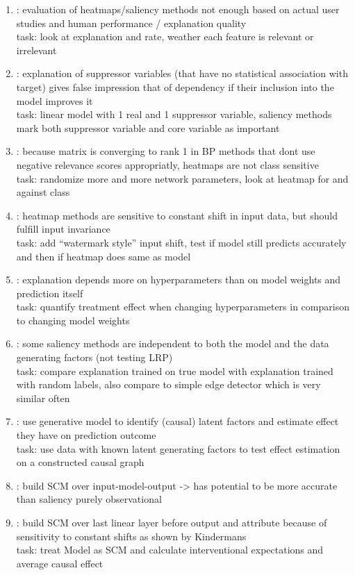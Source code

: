 \begin{enumerate}
      \item \cite{Sixt2022a}: evaluation of heatmaps/saliency methods not enough based on actual user studies and human performance / explanation quality
            \\ task: look at explanation and rate, weather each feature is relevant or irrelevant
      \item \cite{Wilming2023}: explanation of suppressor variables (that have no statistical association with target) gives false impression that of dependency if their inclusion into the model improves it
            \\ task: linear model with 1 real and 1 suppressor variable, saliency methods mark both suppressor variable and core variable as important
      \item \cite{Sixt2020}: because matrix is converging to rank 1 in BP methods that dont use negative relevance scores appropriatly, heatmaps are not class sensitive
            \\ task: randomize more and more network parameters, look at heatmap for and against class
      \item \cite{Kindermans2019}: heatmap methods are sensitive to constant shift in input data, but should fulfill input invariance
            \\ task: add “watermark style” input shift, test if model still predicts accurately and then if heatmap does same as model
      \item \cite{Karimi2023}: explanation depends more on hyperparameters than on model weights and prediction itself
            \\ task: quantify treatment effect when changing hyperparameters in comparison to changing model weights
      \item \cite{Adebayo2018}: some saliency methods are independent to both the model and the data generating factors (not testing LRP)
            \\ task: compare explanation trained on true model with explanation trained with random labels, also compare to simple edge detector which is very similar often
      \item \cite{Parafita2019}: use generative model to identify (causal) latent factors and estimate effect they have on prediction outcome
            \\ task: use data with known latent generating factors to test effect estimation on a constructed causal graph
      \item \cite{Narendra2018}: build SCM over input-model-output -> has potential to be more accurate than saliency purely observational
      \item \cite{Chattopadhyay2019}: build SCM over last linear layer before output and attribute because of sensitivity to constant shifts as shown by Kindermans
            \\ task: treat Model as SCM and calculate interventional expectations and average causal effect
\end{enumerate}

